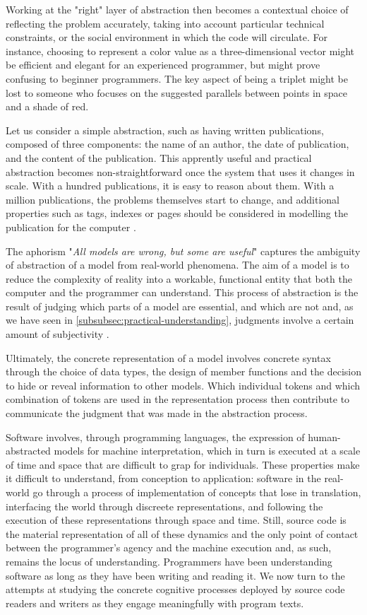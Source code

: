 Working at the "right" layer of abstraction then becomes a contextual choice of reflecting the problem accurately, taking into account particular technical constraints, or the social environment in which the code will circulate. For instance, choosing to represent a color value as a three-dimensional vector might be efficient and elegant for an experienced programmer, but might prove confusing to beginner programmers. The key aspect of being a triplet might be lost to someone who focuses on the suggested parallels between points in space and a shade of red.

Let us consider a simple abstraction, such as having written publications, composed of three components: the name of an author, the date of publication, and the content of the publication. This apprently useful and practical abstraction becomes non-straightforward once the system that uses it changes in scale. With a hundred publications, it is easy to reason about them. With a million publications, the problems themselves start to change, and additional properties such as tags, indexes or pages should be considered in modelling the publication for the computer \citep{cities_peter_2022}.

The aphorism "\emph{All models are wrong, but some are useful}" \citep{box_science_1976} captures the ambiguity of abstraction of a model from real-world phenomena. The aim of a model is to reduce the complexity of reality into a workable, functional entity that both the computer and the programmer can understand. This process of abstraction is the result of judging which parts of a model are essential, and which are not and, as we have seen in \ref{subsubsec:practical-understanding}, judgments involve a certain amount of subjectivity \citep{weizenbaum_computer_1976}.

Ultimately, the concrete representation of a model involves concrete syntax through the choice of data types, the design of member functions and the decision to hide or reveal information to other models. Which individual tokens and which combination of tokens are used in the representation process then contribute to communicate the judgment that was made in the abstraction process.

\spacersmall

Software involves, through programming languages, the expression of human-abstracted models for machine interpretation, which in turn is executed at a scale of time and space that are difficult to grap for individuals. These properties make it difficult to understand, from conception to application: software in the real-world go through a process of implementation of concepts that lose in translation, interfacing the world through discreete representations, and following the execution of these representations through space and time. Still, source code is the material representation of all of these dynamics and the only point of contact between the programmer's agency and the machine execution and, as such, remains the locus of understanding. Programmers have been understanding software as long as they have been writing and reading it. We now turn to the attempts at studying the concrete cognitive processes deployed by source code readers and writers as they engage meaningfully with program texts.

